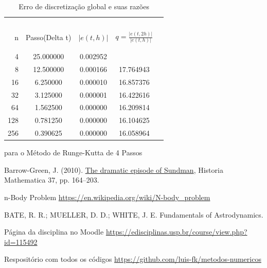 \documentclass[a4paper, 12pt]{article} %
\begin{document}
\begin{table}[H]
    \centering
    \begin{tabular}{rcccc}
    
        \hline\hline\ \\
         n & Passo(Delta t) & $|e(t,h)|$ & $q=\frac{|e(t,2h)|}{|e(t,h)|}$ \\\\
        \hline\hline \\
        4 & 25.000000 & 0.002952 \\
        8 & 12.500000 & 0.000166 & 17.764943 \\
        16 & 6.250000 & 0.000010 & 16.857376 \\
        32 & 3.125000 & 0.000001 & 16.422616 \\
        64 & 1.562500 & 0.000000 & 16.209814 \\
        128 & 0.781250 & 0.000000 & 16.104625 \\
        256 & 0.390625 & 0.000000 & 16.058964 \\
        \hline\hline
    \end{tabular}
    \caption{Erro de discretização global e suas razões}{para o Método de Runge-Kutta de 4 Passos}
    \label{tab1}
\end{table}

\newpage
\begin{thebibliography}{99} 

     Barrow-Green, J. (2010). \href{http://oro.open.ac.uk/22440/2/Sundman_final.pdf}{The dramatic episode of Sundman}, Historia Mathematica 37, pp. 164–203.

    n-Body Problem \url{https://en.wikipedia.org/wiki/N-body_problem}

    BATE, R. R.; MUELLER, D. D.; WHITE, J. E. Fundamentals of Astrodynamics.

    Página da disciplina no Moodle \url{https://edisciplinas.usp.br/course/view.php?id=115492}

    Respositório com todos os códigos \url{https://github.com/luis-fk/metodos-numericos}

\end{thebibliography}
\end{document}
